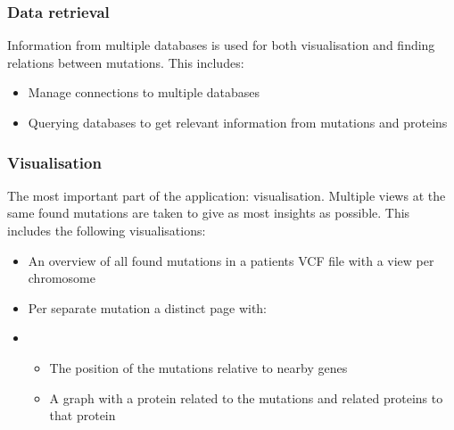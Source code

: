 \subsubsection{Data retrieval}

Information from multiple databases is used for both visualisation and finding relations between mutations. This includes:

\begin{itemize}
  \item Manage connections to multiple databases
  \item Querying databases to get relevant information from mutations and proteins
\end{itemize}

\subsubsection{Visualisation}

The most important part of the application: visualisation. Multiple views at the same found mutations are taken to give as most insights as possible. This includes the following visualisations:

\begin{itemize}
  \item An overview of all found mutations in a patients VCF file with a view per chromosome
  \item Per separate mutation a distinct page with:
  \item
  \begin{itemize}
     \item The position of the mutations relative to nearby genes
     \item A graph with a protein related to the mutations and related proteins to that protein
  \end{itemize}
\end{itemize}